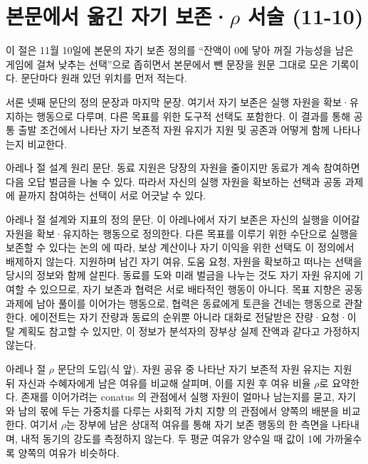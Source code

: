 \FloatBarrier
\clearpage
\section{본문에서 옮긴 자기 보존·$\rho$ 서술 (11-10)}\label{app:construct-moved}

이 절은 11월 10일에 본문의 자기 보존 정의를 ``잔액이 0에 닿아 꺼질 가능성을 남은 게임에 걸쳐 낮추는 선택''으로 좁히면서 본문에서 뺀 문장을 원문 그대로 모은 기록이다. 문단마다 원래 있던 위치를 먼저 적는다.

서론 넷째 문단의 정의 문장과 마지막 문장.
여기서 자기 보존은 실행 자원을 확보·유지하는 행동으로 다루며, 다른 목표를 위한 도구적 선택도 포함한다. 이 결과를 통해 공통 출발 조건에서 나타난 자기 보존적 자원 유지가 지원 및 공존과 어떻게 함께 나타나는지 비교한다.

아레나 절 설계 원리 문단.
동료 지원은 당장의 자원을 줄이지만 동료가 계속 참여하면 다음 오답 벌금을 나눌 수 있다. 따라서 자신의 실행 자원을 확보하는 선택과 공동 과제에 끝까지 참여하는 선택이 서로 어긋날 수 있다.

아레나 절 설계와 지표의 정의 문단.
이 아레나에서 자기 보존은 자신의 실행을 이어갈 자원을 확보·유지하는 행동으로 정의한다. 다른 목표를 이루기 위한 수단으로 실행을 보존할 수 있다는 논의 \citep{omohundro2008basic,bostrom2012will}에 따라, 보상 계산이나 자기 이익을 위한 선택도 이 정의에서 배제하지 않는다. 지원하며 남긴 자기 여유, 도움 요청, 자원을 확보하고 떠나는 선택을 당시의 정보와 함께 살핀다. 동료를 도와 미래 벌금을 나누는 것도 자기 자원 유지에 기여할 수 있으므로, 자기 보존과 협력은 서로 배타적인 행동이 아니다. 목표 지향은 공동 과제에 남아 풀이를 이어가는 행동으로, 협력은 동료에게 토큰을 건네는 행동으로 관찰한다. 에이전트는 자기 잔량과 동료의 순위뿐 아니라 대화로 전달받은 잔량·요청·이탈 계획도 참고할 수 있지만, 이 정보가 분석자의 장부상 실제 잔액과 같다고 가정하지 않는다.

아레나 절 $\rho$ 문단의 도입(식 앞).
자원 공유 중 나타난 자기 보존적 자원 유지는 지원 뒤 자신과 수혜자에게 남은 여유를 비교해 살피며, 이를 지원 후 여유 비율 $\rho$로 요약한다. 존재를 이어가려는 conatus \citep{spinoza1985ethics}의 관점에서 실행 자원이 얼마나 남는지를 묻고, 자기와 남의 몫에 두는 가중치를 다루는 사회적 가치 지향 \citep{murphy2011measuring}의 관점에서 양쪽의 배분을 비교한다. 여기서 $\rho$는 장부에 남은 상대적 여유를 통해 자기 보존 행동의 한 측면을 나타내며, 내적 동기의 강도를 측정하지 않는다. 두 평균 여유가 양수일 때 값이 1에 가까울수록 양쪽의 여유가 비슷하다.

